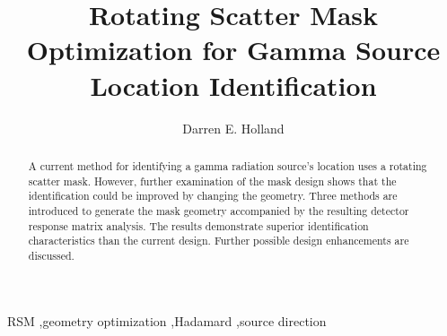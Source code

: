\documentclass[3p,times]{elsarticle}
\begin{document}
\begin{frontmatter}



\dochead{}

\title{Rotating Scatter Mask Optimization for Gamma Source Location Identification}


\author[d1]{Darren E. Holland}

\address[d1]{dholland@cedarville.edu\\
  Department of Mechanical Engineering\\
	Cedarville University \\
	Cedarville, OH 45502 USA\\}

\begin{abstract}
A current method for identifying a gamma radiation source's location uses a rotating scatter mask.  However, further examination of the mask design shows that the identification could be improved by changing the geometry.  Three methods are introduced to generate the mask geometry accompanied by the resulting detector response matrix analysis.  The results demonstrate superior identification characteristics than the current design.  Further possible design enhancements are discussed.
\end{abstract}

\begin{keyword}
RSM \sep geometry optimization \sep Hadamard \sep source direction

\end{keyword}

\end{frontmatter}
\end{document}
